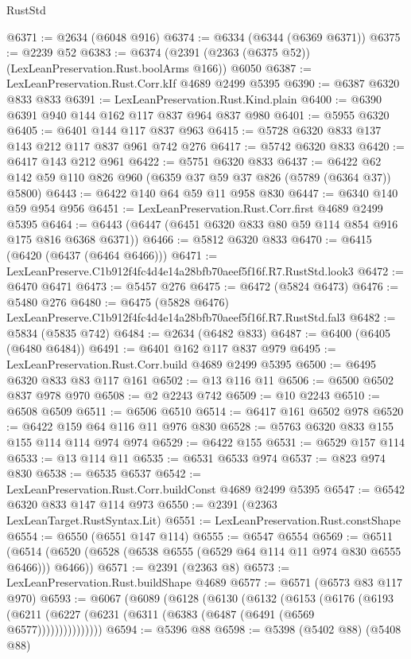 \begin{lexlean}{RustStd}
\begin{coremodule}
@6371 := @2634 (@6048 @916)
@6374 := @6334 (@6344 (@6369 @6371))
@6375 := @2239 @52
@6383 := @6374 (@2391 (@2363 (@6375 @52)) (LexLeanPreservation.Rust.boolArms @166)) @6050
@6387 := LexLeanPreservation.Rust.Corr.kIf @4689 @2499 @5395
@6390 := @6387 @6320 @833 @833
@6391 := LexLeanPreservation.Rust.Kind.plain
@6400 := @6390 @6391 @940 @144 @162 @117 @837 @964 @837 @980
@6401 := @5955 @6320
@6405 := @6401 @144 @117 @837 @963
@6415 := @5728 @6320 @833 @137 @143 @212 @117 @837 @961 @742 @276
@6417 := @5742 @6320 @833
@6420 := @6417 @143 @212 @961
@6422 := @5751 @6320 @833
@6437 := @6422 @62 @142 @59 @110 @826 @960 (@6359 @37 @59 @37 @826 (@5789 (@6364 @37)) @5800)
@6443 := @6422 @140 @64 @59 @11 @958 @830
@6447 := @6340 @140 @59 @954 @956
@6451 := LexLeanPreservation.Rust.Corr.first @4689 @2499 @5395
@6464 := @6443 (@6447 (@6451 @6320 @833 @80 @59 @114 @854 @916 @175 @816 @6368 @6371))
@6466 := @5812 @6320 @833
@6470 := @6415 (@6420 (@6437 (@6464 @6466)))
@6471 := LexLeanPreserve.C1b912f4fc4d4e14a28bfb70aeef5f16f.R7.RustStd.look3
@6472 := @6470 @6471
@6473 := @5457 @276
@6475 := @6472 (@5824 @6473)
@6476 := @5480 @276
@6480 := @6475 (@5828 @6476) LexLeanPreserve.C1b912f4fc4d4e14a28bfb70aeef5f16f.R7.RustStd.fal3
@6482 := @5834 (@5835 @742)
@6484 := @2634 (@6482 @833)
@6487 := @6400 (@6405 (@6480 @6484))
@6491 := @6401 @162 @117 @837 @979
@6495 := LexLeanPreservation.Rust.Corr.build @4689 @2499 @5395
@6500 := @6495 @6320 @833 @83 @117 @161
@6502 := @13 @116 @11
@6506 := @6500 @6502 @837 @978 @970
@6508 := @2 @2243 @742
@6509 := @10 @2243
@6510 := @6508 @6509
@6511 := @6506 @6510
@6514 := @6417 @161 @6502 @978
@6520 := @6422 @159 @64 @116 @11 @976 @830
@6528 := @5763 @6320 @833 @155 @155 @114 @114 @974 @974
@6529 := @6422 @155
@6531 := @6529 @157 @114
@6533 := @13 @114 @11
@6535 := @6531 @6533 @974
@6537 := @823 @974 @830
@6538 := @6535 @6537
@6542 := LexLeanPreservation.Rust.Corr.buildConst @4689 @2499 @5395
@6547 := @6542 @6320 @833 @147 @114 @973
@6550 := @2391 (@2363 LexLeanTarget.RustSyntax.Lit)
@6551 := LexLeanPreservation.Rust.constShape
@6554 := @6550 (@6551 @147 @114)
@6555 := @6547 @6554
@6569 := @6511
    (@6514 (@6520 (@6528 (@6538 @6555 (@6529 @64 @114 @11 @974 @830 @6555 @6466))) @6466))
@6571 := @2391 (@2363 @8)
@6573 := LexLeanPreservation.Rust.buildShape @4689
@6577 := @6571 (@6573 @83 @117 @970)
@6593 := @6067
    (@6089
      (@6128
        (@6130
          (@6132
            (@6153
              (@6176
                (@6193 (@6211 (@6227 (@6231 (@6311 (@6383 (@6487 (@6491 (@6569 @6577)))))))))))))))
@6594 := @5396 @88
@6598 := @5398 (@5402 @88) (@5408 @88)

\end{coremodule}
\end{lexlean}
